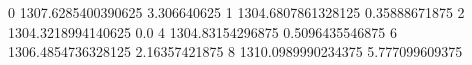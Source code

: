 0 1307.6285400390625 3.306640625
1 1304.6807861328125 0.35888671875
2 1304.3218994140625 0.0
4 1304.83154296875 0.5096435546875
6 1306.4854736328125 2.16357421875
8 1310.0989990234375 5.777099609375
